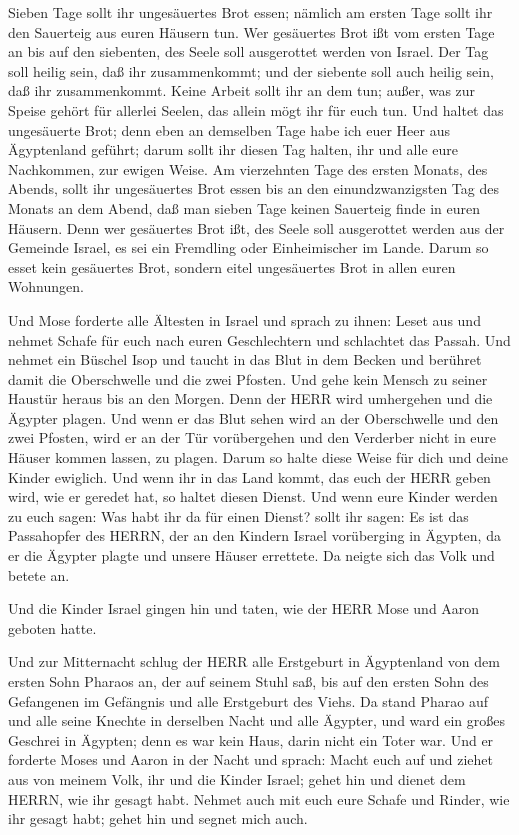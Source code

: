  Sieben Tage sollt ihr ungesäuertes Brot essen; nämlich am
ersten Tage sollt ihr den Sauerteig aus euren Häusern tun. Wer
gesäuertes Brot ißt vom ersten Tage an bis auf den siebenten, des Seele
soll ausgerottet werden von Israel.  Der Tag soll heilig
sein, daß ihr zusammenkommt; und der siebente soll auch heilig sein, daß
ihr zusammenkommt. Keine Arbeit sollt ihr an dem tun; außer, was zur
Speise gehört für allerlei Seelen, das allein mögt ihr für euch tun.
 Und haltet das ungesäuerte Brot; denn eben an demselben
Tage habe ich euer Heer aus Ägyptenland geführt; darum sollt ihr diesen
Tag halten, ihr und alle eure Nachkommen, zur ewigen Weise.
 Am vierzehnten Tage des ersten Monats, des Abends, sollt
ihr ungesäuertes Brot essen bis an den einundzwanzigsten Tag des Monats
an dem Abend,  daß man sieben Tage keinen Sauerteig finde
in euren Häusern. Denn wer gesäuertes Brot ißt, des Seele soll
ausgerottet werden aus der Gemeinde Israel, es sei ein Fremdling oder
Einheimischer im Lande.  Darum so esset kein gesäuertes
Brot, sondern eitel ungesäuertes Brot in allen euren Wohnungen.

 Und Mose forderte alle Ältesten in Israel und sprach zu
ihnen: Leset aus und nehmet Schafe für euch nach euren Geschlechtern und
schlachtet das Passah.  Und nehmet ein Büschel Isop und
taucht in das Blut in dem Becken und berühret damit die Oberschwelle und
die zwei Pfosten. Und gehe kein Mensch zu seiner Haustür heraus bis an
den Morgen.  Denn der HERR wird umhergehen und die Ägypter
plagen. Und wenn er das Blut sehen wird an der Oberschwelle und den zwei
Pfosten, wird er an der Tür vorübergehen und den Verderber nicht in eure
Häuser kommen lassen, zu plagen.  Darum so halte diese
Weise für dich und deine Kinder ewiglich.  Und wenn ihr in
das Land kommt, das euch der HERR geben wird, wie er geredet hat, so
haltet diesen Dienst.  Und wenn eure Kinder werden zu euch
sagen: Was habt ihr da für einen Dienst?  sollt ihr sagen:
Es ist das Passahopfer des HERRN, der an den Kindern Israel vorüberging
in Ägypten, da er die Ägypter plagte und unsere Häuser errettete. Da
neigte sich das Volk und betete an.

 Und die Kinder Israel gingen hin und taten, wie der HERR
Mose und Aaron geboten hatte.

 Und zur Mitternacht schlug der HERR alle Erstgeburt in
Ägyptenland von dem ersten Sohn Pharaos an, der auf seinem Stuhl saß,
bis auf den ersten Sohn des Gefangenen im Gefängnis und alle Erstgeburt
des Viehs.  Da stand Pharao auf und alle seine Knechte in
derselben Nacht und alle Ägypter, und ward ein großes Geschrei in
Ägypten; denn es war kein Haus, darin nicht ein Toter war. 
Und er forderte Moses und Aaron in der Nacht und sprach: Macht euch auf
und ziehet aus von meinem Volk, ihr und die Kinder Israel; gehet hin und
dienet dem HERRN, wie ihr gesagt habt.  Nehmet auch mit
euch eure Schafe und Rinder, wie ihr gesagt habt; gehet hin und segnet
mich auch.

